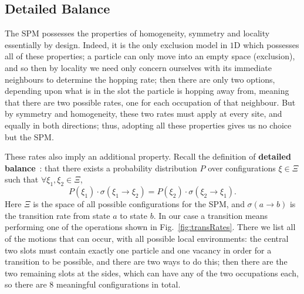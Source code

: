 \subsection{Detailed Balance} \label{sec:dbProof}
The SPM possesses the properties of homogeneity, symmetry and locality essentially by design. Indeed, it is
the only exclusion model in $1$D which possesses all of these properties; a particle can only move into
an empty space (exclusion), and so then by locality we need only concern ourselves with its immediate 
neighbours to determine the hopping rate; then there are only two options, depending upon what is in the 
slot the particle is hopping away from, meaning that there are two possible rates, one for each occupation
of that neighbour. But by symmetry and homogeneity, these two rates must apply at every site, and equally
in both directions; thus, adopting all these properties gives us no choice but the SPM.

These rates also imply an additional property. Recall the definition of 
\textbf{detailed balance}~\cite{gardiner1985}:
that there exists
a probability distribution $P$ over configurations $\xi \in \Xi$ such that 
$\forall \xi_1 , \xi_2 \in \Xi $,
  \begin{equation} \label{eq:dbDefn}
    P(\xi_1) \cdot \sigma(\xi_1 \rightarrow \xi_2) = P(\xi_2) \cdot \sigma(\xi_2 \rightarrow \xi_1).
  \end{equation}  
Here $\Xi$ is the space of all possible configurations for the SPM, and 
$\sigma(a \rightarrow b)$ is the transition rate from state $a$ to state $b$. In our case a transition
means performing one of the operations shown in Fig.~\ref{fig:transRates}. There we
list all of the motions that can occur, with all possible local environments: the central two slots must
contain exactly one particle and one vacancy in order for a transition to be possible, and there are two
ways to do this; then there are the two remaining slots at the sides, which can have any of the two
occupations each, so there are $8$ meaningful configurations in total.


